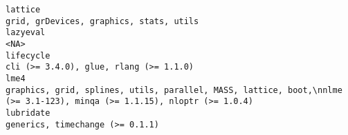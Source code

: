\documentclass[
  letterpaper,
  DIV=11,
  numbers=noendperiod]{scrreprt}
\begin{document}
\begin{verbatim}
lattice                                                                                                                                                                                                                                                                                                                                                                                                                                                                                                                                                                            grid, grDevices, graphics, stats, utils
lazyeval                                                                                                                                                                                                                                                                                                                                                                                                                                                                                                                                                                                                              <NA>
lifecycle                                                                                                                                                                                                                                                                                                                                                                                                                                                                                                                                                                           cli (>= 3.4.0), glue, rlang (>= 1.1.0)
lme4                                                                                                                                                                                                                                                                                                                                                                                                                                                                                               graphics, grid, splines, utils, parallel, MASS, lattice, boot,\nnlme (>= 3.1-123), minqa (>= 1.1.15), nloptr (>= 1.0.4)
lubridate                                                                                                                                                                                                                                                                                                                                                                                                                                                                                                                                                                                  generics, timechange (>= 0.1.1)

\end{verbatim}
\end{document}
